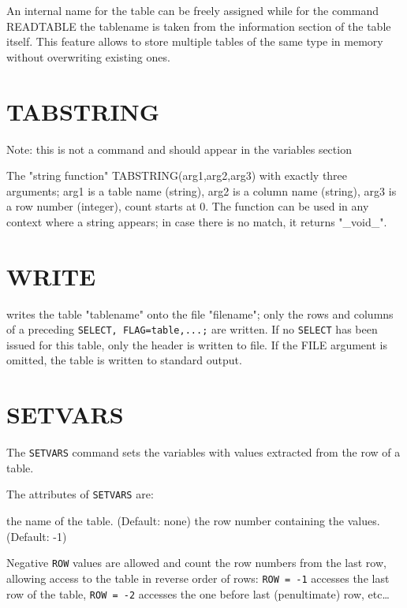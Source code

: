 An internal name for the table can be freely assigned while for the
command READTABLE the tablename is taken from the information section of
the table itself.  
This feature allows to store multiple tables of the same type in memory without
overwriting existing ones.   

\section{TABSTRING}
\label{sec:tabstring}
Note: this is not a command and should appear in the variables section

The "string function" TABSTRING(arg1,arg2,arg3) with exactly  three
arguments; arg1 is a table name (string), arg2 is a column name
(string), arg3 is a row number (integer), count starts at 0. The
function can be used in any context where a string appears; in case
there is no match, it returns "\_void\_".  

\section{WRITE}
\label{sec:write}
writes the table "tablename" onto the file "filename"; only the rows and
columns of a preceding \texttt{SELECT, FLAG=table,...;} are written. 
If no \texttt{SELECT} has been issued for this table, only the header is
written to file.
If the FILE argument is omitted, the table is written to standard output.  



\section{SETVARS}
\label{sec:setvars}

The \texttt{SETVARS} command sets the variables with values extracted
from the row of a table.


The attributes of \texttt{SETVARS} are:
\begin{madlist}
   the name of the table. (Default: none)
   the row number containing the values. (Default: -1)
\end{madlist}

Negative \texttt{ROW} values are allowed and count the row numbers from
the last row, allowing access to the table in reverse order of rows:
\texttt{ROW~=~-1} accesses the last row of the table,
\texttt{ROW~=~-2} accesses the one before last (penultimate) row,
etc\ldots  

